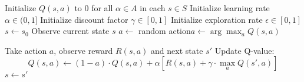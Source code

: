 \begin{algorithm}
\caption{}
\begin{algorithmic}[1]
\Statex \vspace{0.5em}  
 \State Initialize $Q(s, a)$ to 0 for all $\alpha \in A$ in each $s \in S$
    \State Initialize learning rate $\alpha \in (0, 1]$
    \State Initialize discount factor $\gamma \in [0, 1]$
    \State Initialize exploration rate $\epsilon \in [0, 1]$
        \State $s \gets s_{0}$
            \State Observe current state $s$
            \State $a \gets$ random action\Else \State $a \gets \arg\max_{a} Q(s, a)$\EndIf

            \State Take action $a$, observe reward $R(s, a)$ and next state $s'$
            \State Update Q-value:
            \[
            Q(s, a) \gets (1-a) \cdot Q(s, a) + \alpha \left[ R(s, a) + \gamma \cdot\max_{a} Q(s', a)\right]
            \]
            \State $s \gets s'$
        \EndWhile
    \EndWhile
\Statex  
\end{algorithmic}
\end{algorithm}
